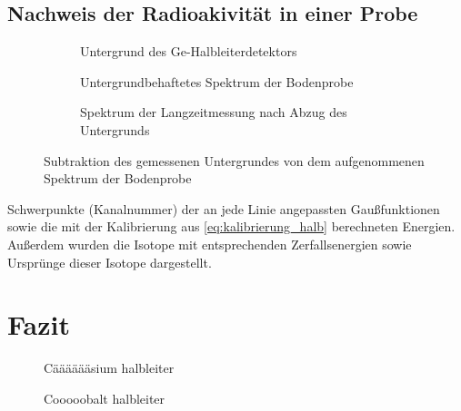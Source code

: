 \documentclass[11pt, a4paper]{article}
\numberwithin{equation}{section}
\begin{document}
\subsection{Nachweis der Radioakivität in einer Probe}

\begin{figure}[hp]
	\centering
	\begin{subfigure}[b]{0.65\textwidth}
		\resizebox{!}{0.28\textheight}{
			
		}
		\caption{Untergrund des Ge-Halbleiterdetektors}
		\label{fig:untergrund}
	\end{subfigure}
	
	\begin{subfigure}[b]{0.65\textwidth}
		\resizebox{!}{0.28\textheight}{
			
		}
		\caption{Untergrundbehaftetes Spektrum der Bodenprobe}
		\label{fig:probe_mit_untergrund}
	\end{subfigure}
	
	\begin{subfigure}[b]{0.65\textwidth}
		\resizebox{!}{0.28\textheight}{
			
		}
		\caption{Spektrum der Langzeitmessung nach Abzug des Untergrunds}
		\label{fig:probe_ohne_untergrund}
	\end{subfigure}
	\caption{Subtraktion des gemessenen Untergrundes von dem aufgenommenen Spektrum der Bodenprobe}
	\label{fig:langzeitmessung_untergrundabzug}
\end{figure}

\begin{table}[ht]
	\centering
	\resizebox{\textwidth}{!}{
	
	}
	\caption{Schwerpunkte (Kanalnummer) der an jede Linie angepassten Gaußfunktionen sowie die mit der Kalibrierung aus \eqref{eq:kalibrierung_halb} berechneten Energien. Außerdem wurden die Isotope mit entsprechenden Zerfallsenergien sowie Ursprünge dieser Isotope dargestellt.}
\end{table}

\section{Fazit}

\begin{figure}[h]
	\centering
	
	\caption{Cääääääsium halbleiter}
	\label{fig:halb_caesium_spektrum}
\end{figure}

\begin{figure}[h]
	\centering
	
	\caption{Cooooobalt halbleiter}
	\label{fig:halb_cobalt_spektrum}
\end{figure}
\end{document}
